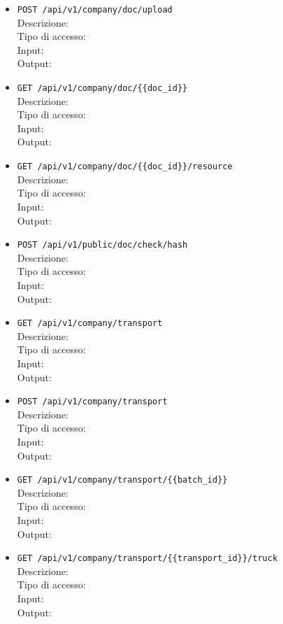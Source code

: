 \documentclass[a4paper,11pt]{article}
\begin{document}
\begin{itemize}
  \item \texttt{POST /api/v1/company/doc/upload}
    \\ Descrizione:
    \\ Tipo di accesso:
    \\ Input:
    \\ Output:

  \item \texttt{GET /api/v1/company/doc/\{\{doc\_id\}\}}
    \\ Descrizione:
    \\ Tipo di accesso:
    \\ Input:
    \\ Output:

  \item \texttt{GET /api/v1/company/doc/\{\{doc\_id\}\}/resource}
    \\ Descrizione:
    \\ Tipo di accesso:
    \\ Input:
    \\ Output:

  \item \texttt{POST /api/v1/public/doc/check/{{hash}}}
    \\ Descrizione:
    \\ Tipo di accesso:
    \\ Input:
    \\ Output:

  \item \texttt{GET /api/v1/company/transport}
    \\ Descrizione:
    \\ Tipo di accesso:
    \\ Input:
    \\ Output:

  \item \texttt{POST /api/v1/company/transport}
    \\ Descrizione:
    \\ Tipo di accesso:
    \\ Input:
    \\ Output:

  \item \texttt{GET /api/v1/company/transport/\{\{batch\_id\}\}}
    \\ Descrizione:
    \\ Tipo di accesso:
    \\ Input:
    \\ Output:

  \item \texttt{GET /api/v1/company/transport/\{\{transport\_id\}\}/truck}
    \\ Descrizione:
    \\ Tipo di accesso:
    \\ Input:
    \\ Output:


\end{itemize}
\end{document}
